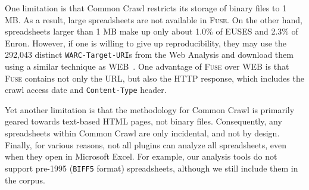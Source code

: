 \documentclass{svjour3}
\newcommand{\urlcountunique}{292,043}
\begin{document}
One limitation is that Common Crawl restricts its storage of binary files to 1 MB. As a result, large spreadsheets are not available in \textsc{Fuse}. On the other hand, spreadsheets larger than 1 MB make up only about 1.0\% of EUSES and 2.3\% of Enron.
%
However, if one is willing to give up reproducibility, they may use the \urlcountunique{} distinct \texttt{WARC-Target-URI}s from the Web Analysis and download them using a similar technique as WEB~\cite{Chen2013}. 
%
One advantage of \textsc{Fuse} over WEB is that \textsc{Fuse} contains not only the URL, but also the HTTP response, which includes the crawl access date and \texttt{Content-Type} header.

Yet another limitation is that the methodology for Common Crawl is primarily geared towards text-based HTML pages, not binary files. Consequently, any spreadsheets within Common Crawl are only incidental, and not by design. 
%
Finally, for various reasons, not all plugins can analyze all spreadsheets, even when they open in Microsoft Excel. 
%
For example, our analysis tools do not support pre-1995 (\texttt{BIFF5} format) spreadsheets, although we still include them in the corpus.




\end{document}
